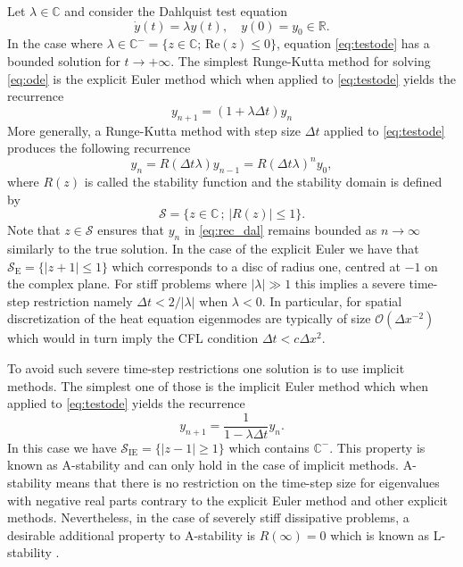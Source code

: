 \documentclass[10pt,a4paper]{article}
\newcommand{\R}{\mathbb{R}}
\def \IC{\mathbb C}
\newcommand{\calS}{\mathcal{S}}
\renewcommand{\R}{\mathbb{R}}
\begin{document}
        Let $\lambda\in \IC $ and consider the Dahlquist test equation
        \begin{equation}\label{eq:testode}
            \dot y(t) = \lambda y(t), \quad y(0)=y_0\in \R.
        \end{equation}
        In the case where $\lambda \in \IC^-=\{z \in \IC;\,\text{Re}(z) \leq 0\}$, equation \eqref{eq:testode} has a bounded solution for  $t \rightarrow +\infty$. The simplest Runge-Kutta method for solving \eqref{eq:ode} is the explicit Euler method which when applied to \eqref{eq:testode} yields the recurrence
        \begin{equation}
            y_{n+1}=(1+\lambda \Delta t)y_{n}
        \end{equation}
        More generally, a Runge-Kutta method with step size $\Delta t$ applied to \eqref{eq:testode} produces the following recurrence
        \begin{equation} \label{eq:rec_dal}
        y_{n}=R(\Delta t\lambda)y_{n-1}=R(\Delta t \lambda)^ny_0,
        \end{equation}
        where $R(z)$ is called the stability function and the stability domain is defined by
        \begin{equation*}
            \calS=\{z\in\IC\,;\,|R(z)|\leq 1\}.
        \end{equation*}
        Note that $z \in \calS$ ensures that $y_{n}$ in \eqref{eq:rec_dal} remains bounded as $n \rightarrow \infty$ similarly to the true solution. In the case of the explicit Euler we have that 
        $
        \mathcal{S}_{\text{E}}=\{|z+1|\leq 1 \}
        $
        which corresponds to a disc of radius one, centred at $-1$ on the complex plane. For stiff problems where $|\lambda| \gg 1$ this implies a severe time-step restriction namely $\Delta t < 2/|\lambda|$ when $\lambda <0$. In particular, for spatial discretization of the heat equation eigenmodes are typically of size $\mathcal{O}(\Delta x ^{-2})$ which would in turn imply the CFL condition $\Delta t  < c \Delta x^{2}$.

        To avoid such severe time-step restrictions one solution is to use implicit methods. The simplest one of those is the implicit Euler method which when applied to  \eqref{eq:testode} yields the recurrence
        \[
        y_{n+1}=\frac{1}{1-\lambda \Delta t} y_{n}.
        \]
        In this  case we have $\mathcal{S}_{\text{IE}}=\{|z-1| \geq 1 \}$ which contains $\mathbb{C}^{-}$. This property is known as A-stability and can only hold in the case of implicit methods.  A-stability means that there is no restriction on the time-step size for eigenvalues with negative real parts contrary to the {explicit} Euler method and other explicit methods. Nevertheless, in the case of severely stiff  dissipative problems, a desirable additional property to A-stability is $R(\infty)=0$ which is known as L-stability \cite{HaW96}.      
        
\end{document}
